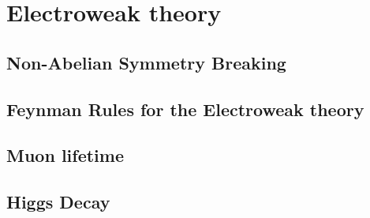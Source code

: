 \chapter{Electroweak theory}

\section{Non-Abelian Symmetry Breaking}

\section{Feynman Rules for the Electroweak theory}

\section{Muon lifetime}

\section{Higgs Decay}